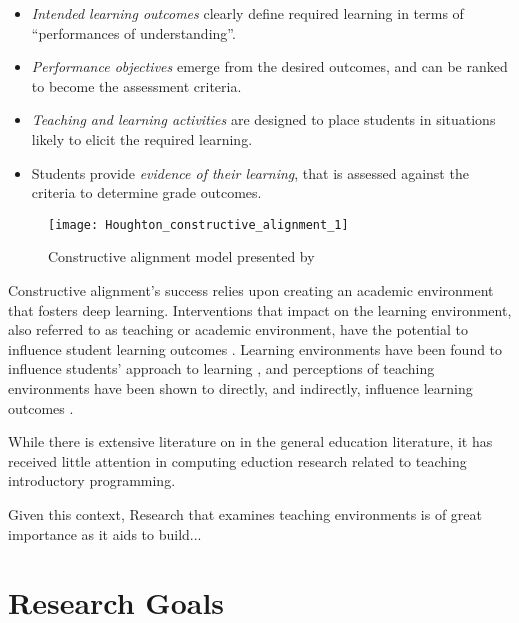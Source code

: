 \begin{itemize}
  \item \emph{Intended learning outcomes} clearly define required learning in terms of ``performances of understanding''.
  \item \emph{Performance objectives} emerge from the desired outcomes, and can be ranked to become the assessment criteria.
  \item \emph{Teaching and learning activities} are designed to place students in situations likely to elicit the required learning.
  \item Students provide \emph{evidence of their learning}, that is assessed against the criteria to determine grade outcomes.
\end{itemize}

\begin{figure}[htbp]
  \centering
  \texttt{[image: Houghton\_constructive\_alignment\_1]}
  \caption{Constructive alignment model presented by ~\citet{Houghton:2004}}
  \label{fig:constructive_alignment}
\end{figure}

Constructive alignment's success relies upon creating an academic environment that fosters deep learning. Interventions that impact on the learning environment, also referred to as teaching or academic environment, have the potential to influence student learning outcomes \cite{Trigwell:1991}. Learning environments have been found to influence students' approach to learning \cite{Entwistle:1990,Entwistle:1991,Kember:2007}, and perceptions of teaching environments have been shown to directly, and indirectly, influence learning outcomes \cite{Meyer:1990,Lizzio:2002}.



While there is extensive literature on \CA in the general education literature, it has received little attention in computing eduction research related to teaching introductory programming. 

Given this context, 
Research that examines teaching environments is of great importance as it aids to build...



\section{Research Goals} %
\label{sec:research_goals}

